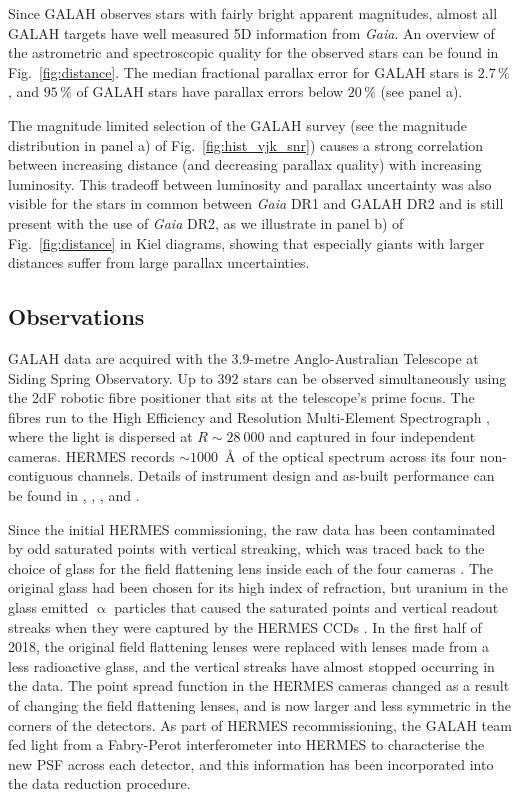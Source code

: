 \documentclass[fleqn,usenatbib,useAMS]{mnras}
\newcommand{\Gaia}{\textit{Gaia}\xspace}
\begin{document}
Since GALAH observes stars with fairly bright apparent magnitudes, almost all GALAH targets have well measured 5D information from \Gaia \citep{Brown2018, Lindegren2018}. An overview of the astrometric and spectroscopic quality for the observed stars can be found in Fig.~\ref{fig:distance}. The median fractional parallax error for GALAH stars is $2.7\,\%$, and $95\,\%$ of GALAH stars have parallax errors below $20\,\%$ (see panel a).

The magnitude limited selection of the GALAH survey (see the magnitude distribution in panel a) of Fig.~\ref{fig:hist_vjk_snr}) causes a strong correlation between increasing distance (and decreasing parallax quality) with increasing luminosity. This tradeoff between luminosity and parallax uncertainty was also visible for the stars in common between \Gaia DR1 and GALAH DR2 \citep{Buder2019} and is still present with the use of \Gaia DR2, as we illustrate in panel b) of Fig.~\ref{fig:distance} in Kiel diagrams, showing that especially giants with larger distances suffer from large parallax uncertainties.

\subsection{Observations}

GALAH data are acquired with the 3.9-metre Anglo-Australian Telescope at Siding Spring Observatory. Up to 392 stars can be observed simultaneously using the 2dF robotic fibre positioner \citep{Lewis2002} that sits at the telescope's prime focus. The fibres run to the High Efficiency and Resolution Multi-Element Spectrograph \citep[HERMES][]{DeSilva2015, Sheinis2015}, where the light is dispersed at $R\sim 28~000$ and captured in four independent cameras. HERMES records $\sim1000$~\AA\ of the optical spectrum across its four non-contiguous channels. Details of instrument design and as-built performance can be found in \citet{Barden2010}, \citet{Brzeski2011}, \citet{Heijmans2012}, \citet{Farrell2014} and \citet{Sheinis2015}.

Since the initial HERMES commissioning, the raw data has been contaminated by odd saturated points with vertical streaking, which was traced back to the choice of glass for the field flattening lens inside each of the four cameras \citep{Martell2017}. The original glass had been chosen for its high index of refraction, but uranium in the glass emitted $\upalpha$ particles that caused the saturated points and vertical readout streaks when they were captured by the HERMES CCDs \citep{Edgar2018}. In the first half of 2018, the original field flattening lenses were replaced with lenses made from a less radioactive glass, and the vertical streaks have almost stopped occurring in the data. The point spread function in the HERMES cameras changed as a result of changing the field flattening lenses, and is now larger and less symmetric in the corners of the detectors. As part of HERMES recommissioning, the GALAH team fed light from a Fabry-Perot interferometer into HERMES to characterise the new PSF across each detector, and this information has been incorporated into the data reduction procedure.
\end{document}
